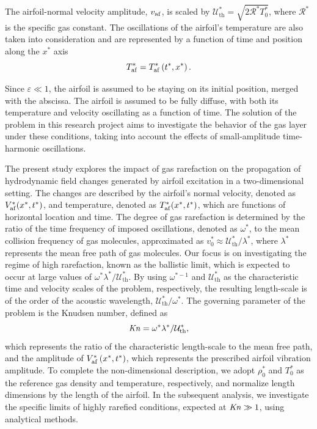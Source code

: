 The airfoil-normal velocity amplitude, $v_{\mathrm{af}}$, is scaled by $\mathcal{U}_{\mathrm{th}}^*=\sqrt{2\mathcal{R}^*T_0^*}$, where $\mathcal{R}^*$ is the specific gas constant. The oscillations of the airfoil's temperature are also taken into consideration and are represented by a function of time and position along the $x^*$ axis
\begin{equation} \label{eq:T_af}
    T_{\mathrm{af}}^*=T_{\mathrm{af}}^*\left(t^*,x^*\right)
    .
\end{equation}

Since $\varepsilon\ll 1$, the airfoil is assumed to be staying on its initial position, merged with the abscissa. The airfoil is assumed to be fully diffuse, with both its temperature and velocity oscillating as a function of time. The solution of the problem in this research project aims to investigate the behavior of the gas layer under these conditions, taking into account the effects of small-amplitude time-harmonic oscillations.

The present study explores the impact of gas rarefaction on the propagation of hydrodynamic field changes generated by airfoil excitation in a two-dimensional setting. The changes are described by the airfoil's normal velocity, denoted as $V_{\mathrm{af}}^*(x^*,t^*)$, and temperature, denoted as $T_{\mathrm{af}}^*(x^*,t^*)$, which are functions of horizontal location and time. The degree of gas rarefaction is determined by the ratio of the time frequency of imposed oscillations, denoted as $\omega^*$, to the mean collision frequency of gas molecules, approximated as $v_0^*\approx \mathcal{U}_{\mathrm{th}}^* / \lambda^*$, where $\lambda^*$ represents the mean free path of gas molecules. Our focus is on investigating the regime of high rarefaction, known as the ballistic limit, which is expected to occur at large values of $\omega^* \lambda^* / \mathcal{U}_{\mathrm{th}}^*$. By using $\omega^{*-1}$ and $\mathcal{U}_{\mathrm{th}}^*$ as the characteristic time and velocity scales of the problem, respectively, the resulting length-scale is of the order of the acoustic wavelength, $\mathcal{U}_{\mathrm{th}}^* / \omega^*$. The governing parameter of the problem is the Knudsen number, defined as
\begin{equation} \label{eq:Knud}
 \operatorname{\mathit{K\kern-.11em n}}
 =
 \omega^* \lambda^* / \mathcal{U}_{\mathrm{th}}^*
 ,
\end{equation}
which represents the ratio of the characteristic length-scale to the mean free path, and the amplitude of $V_{\mathrm{af}}^*\left(x^*,t^*\right)$, which represents the prescribed airfoil vibration amplitude. To complete the non-dimensional description, we adopt $\rho_0^*$ and $T_0^*$ as the reference gas density and temperature, respectively, and normalize length dimensions by the length of the airfoil. In the subsequent analysis, we investigate the specific limits of highly rarefied conditions, expected at $\operatorname{\mathit{K\kern-.11em n}} \gg 1$, using analytical methods.

